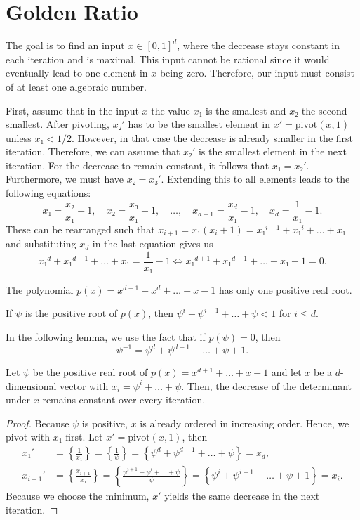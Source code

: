 \section{Golden Ratio}

The goal is to find an input $x ∈ [0, 1]^d$,
where the decrease stays constant in each iteration and is maximal.
This input cannot be rational since it would eventually lead to one element in $x$ being zero.
Therefore, our input must consist of at least one algebraic number.

First, assume that in the input $x$ the value $x₁$ is the smallest and $x₂$ the second smallest.
After pivoting, $x₂'$ has to be the smallest element in $x' = \mathrm{pivot}(x, 1)$ unless $x₁ < 1/2$.
However, in that case the decrease is already smaller in the first iteration.
Therefore, we can assume that $x₂'$ is the smallest element in the next iteration.
For the decrease to remain constant, it follows that $x₁ = x₂'$.
Furthermore, we must have $x₂ = x₃'$.
Extending this to all elements leads to the following equations:
\[
  x₁ = \frac{x₂}{x₁} - 1,
  \quad x₂ = \frac{x₃}{x₁} - 1,
  \quad \dots,
  \quad x_{d-1} = \frac{x_d}{x₁} - 1,
  \quad x_d = \frac{1}{x₁} - 1.
\]
These can be rearranged such that $x_{i + 1} = x₁ (x_i + 1) = x₁^{i+1} + x₁^i + \dots + x₁$
and substituting $x_d$ in the last equation gives us
\[
  x₁^d + x₁^{d-1} + \dots + x₁ = \frac{1}{x₁} - 1
  \iff
  x₁^{d+1} + x₁^{d-1} + \dots + x₁ - 1 = 0.
\]

\begin{lemma}
  The polynomial $p(x) = x^{d+1} + x^d + \dots + x - 1$ has only one positive real root.
\end{lemma}

\begin{corollary}
  If $ψ$ is the positive root of $p(x)$, then $ψ^i + ψ^{i-1} + \dots + ψ < 1$ for $i ≤ d$.
\end{corollary}

In the following lemma, we use the fact that if $p(ψ) = 0$, then
\[
  ψ^{-1} = ψ^d + ψ^{d-1} + \dots + ψ + 1.
\]

\begin{lemma}
  Let $ψ$ be the positive real root of $p(x) = x^{d+1} + \dots + x - 1$
  and let $x$ be a $d$-dimensional vector with $x_i = ψ^i + \dots + ψ$.
  Then, the decrease of the determinant under $x$ remains constant over every iteration.
\end{lemma}

\begin{proof}
  Because $ψ$ is positive, $x$ is already ordered in increasing order.
  Hence, we pivot with $x₁$ first.
  Let $x' = \mathrm{pivot}(x, 1)$,
  then
  \begin{align*}
    x₁'
    & = \left\{\frac{1}{x₁}\right\}
    = \left\{\frac1{ψ}\right\}
    = \left\{ψ^d + ψ^{d-1} + \dots + ψ\right\} = x_d, \\
    x_{i+1}'
    & = \left\{\frac{x_{i+1}}{x₁}\right\}
    = \left\{\frac{ψ^{i+1} + ψ^i + \dots + ψ}{ψ}\right\}
    = \left\{ψ^i + ψ^{i-1} + \dots + ψ + 1\right\}
    = x_i.
  \end{align*}
  Because we choose the minimum, $x'$ yields the same decrease in the next iteration.
\end{proof}

